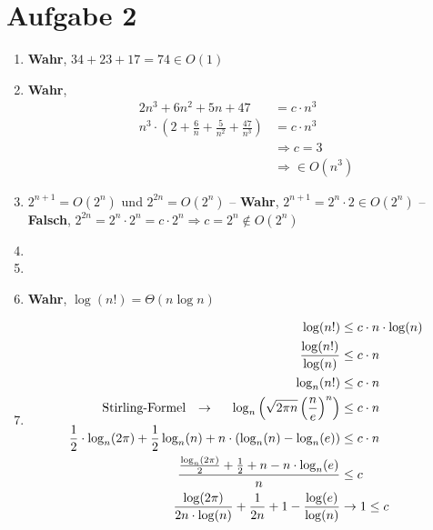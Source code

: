 \newpage
\section*{Aufgabe 2}
	\begin{enumerate}[nolistsep, noitemsep, label=\alph*)]
    	\item \textbf{Wahr}, $34 + 23 + 17 = 74 \in O(1)$
        \item \textbf{Wahr}, \begin{align*}
                2n^3 + 6n^2 + 5n + 47 &= c \cdot n^3 \\
                n^3 \cdot \left( 2 + \frac{6}{n} + \frac{5}{n^2} + \frac{47}{n^3} \right) &= c \cdot n^3 \\
                &\Rightarrow  c = 3 \\
                &\Rightarrow \in O(n^3)
            \end{align*}
        \item $2^{n + 1} = O(2^n)$ und $2^{2n} = O(2^n)$
        	\subitem -- \textbf{Wahr}, $2^{n + 1} = 2^n \cdot 2 \in O(2^n)$
            \subitem -- \textbf{Falsch}, $2^{2n} = 2^n \cdot 2^n = c \cdot 2^n \Rightarrow c = 2^n \not\in O(2^n)$
		\item[]
		\item[]
        \item \textbf{Wahr}, $\log(n!) = \Theta(n \log n)$
        \item[] \begin{align*}
                \log(n!) &\leq c \cdot n \cdot \log(n) \\
                \frac{\log(n!)}{\log(n)} &\leq c \cdot n \\
                \log_n(n!) &\leq c \cdot n    \\
                \text{Stirling-Formel} \hspace{0.25cm} \rightarrow \hspace{0.5cm} \log_n\left( \sqrt{2 \pi n} \left( \frac{n}{e} \right)^n \right) &\leq c \cdot n \\
                \frac{1}{2} \cdot \log_n( 2 \pi ) + \frac{1}{2} \log_n(n) + n \cdot \left( \log_n(n) - \log_n(e) \right) &\leq c \cdot n\\
                \frac{\frac{\log_n( 2 \pi )}{2} + \frac{1}{2} + n - n \cdot \log_n(e)}{n} &\leq c \\
                \frac{\log( 2 \pi )}{2n \cdot \log(n)} + \frac{1}{2n} + 1 - \frac{\log(e)}{\log(n)} &\rightarrow 1 \leq c
            \end{align*}

\end{enumerate}
